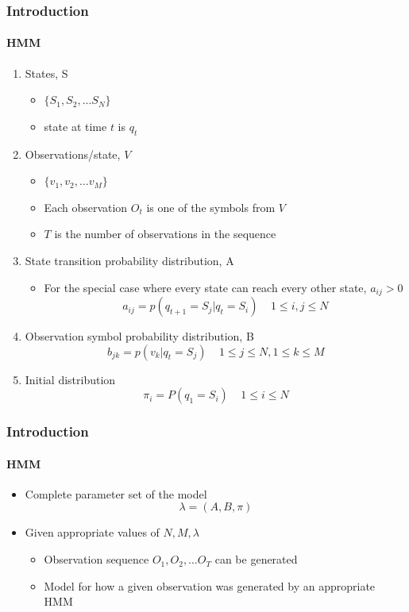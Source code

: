\begin{frame}
\frametitle{Introduction}
\framesubtitle{HMM}
\logoCSIPCPL\mypagenum
	\begin{enumerate}
		\item {\color{red} States, S} 
			\begin{itemize}
				\item $\{S_1, S_2, ... S_N\}$
				\item state at time $t$ is $q_t$
			\end{itemize}
		\item {\color{red} Observations/state, $V$}
			\begin{itemize}
				\item $\{v_1, v_2, ... v_M\}$
				\item Each observation $O_t$ is one of the symbols from $V$
				\item $T$ is the number of observations in the sequence
			\end{itemize}
		\item {\color{red} State transition probability distribution, A}  
			\begin{itemize}
				\item For the special case where every state can reach every other state, $a_{ij}>0$
					\begin{equation*}
						a_{ij} = p(q_{t+1}=S_j|q_t=S_i)  \ \ \ \ \ 1 \leq i, j \leq N
					\end{equation*}
			\end{itemize}
		\item {\color{red}Observation symbol probability distribution, B}
			\begin{equation*}
				b_{jk} = p(v_k|q_t=S_j)  \ \ \ \ \ 1 \leq j \leq N,  1 \leq k \leq M
			\end{equation*}
		\item {\color{red}Initial distribution}
			\begin{equation*}
				\pi_i	= P(q_1=S_i) \ \ \ \ \ 1 \leq i \leq N
			\end{equation*}
	\end{enumerate}
\end{frame}





\begin{frame}
\frametitle{Introduction}
\framesubtitle{HMM}
\logoCSIPCPL\mypagenum
	\begin{itemize}
		\item Complete parameter set of the model
				\begin{equation*}
					\lambda = (A, B, \pi)
				\end{equation*}
		\item Given appropriate values of $N, M, \lambda$
			\begin{itemize}
				\item Observation sequence $O_1, O_2, \ldots O_T$ can be generated
				\item Model for how a given observation was generated by an appropriate HMM
			\end{itemize}
	\end{itemize}
\end{frame}


